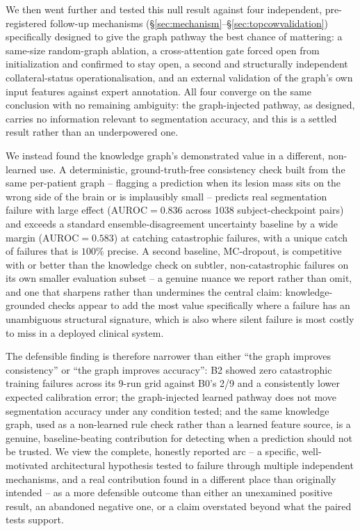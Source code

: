 \documentclass[conference]{IEEEtran}
\begin{document}
We then went further and tested this null result against four independent, pre-registered follow-up mechanisms (\S\ref{sec:mechanism}--\S\ref{sec:topcowvalidation}) specifically designed to give the graph pathway the best chance of mattering: a same-size random-graph ablation, a cross-attention gate forced open from initialization and confirmed to stay open, a second and structurally independent collateral-status operationalisation, and an external validation of the graph's own input features against expert annotation. All four converge on the same conclusion with no remaining ambiguity: the graph-injected pathway, as designed, carries no information relevant to segmentation accuracy, and this is a settled result rather than an underpowered one.

We instead found the knowledge graph's demonstrated value in a different, non-learned use. A deterministic, ground-truth-free consistency check built from the same per-patient graph -- flagging a prediction when its lesion mass sits on the wrong side of the brain or is implausibly small -- predicts real segmentation failure with large effect ($\mathrm{AUROC}=0.836$ across 1038 subject-checkpoint pairs) and exceeds a standard ensemble-disagreement uncertainty baseline by a wide margin ($\mathrm{AUROC}=0.583$) at catching catastrophic failures, with a unique catch of failures that is $100\%$ precise. A second baseline, MC-dropout, is competitive with or better than the knowledge check on subtler, non-catastrophic failures on its own smaller evaluation subset -- a genuine nuance we report rather than omit, and one that sharpens rather than undermines the central claim: knowledge-grounded checks appear to add the most value specifically where a failure has an unambiguous structural signature, which is also where silent failure is most costly to miss in a deployed clinical system.

The defensible finding is therefore narrower than either ``the graph improves consistency'' or ``the graph improves accuracy'': B2 showed zero catastrophic training failures across its 9-run grid against B0's 2/9 and a consistently lower expected calibration error; the graph-injected learned pathway does not move segmentation accuracy under any condition tested; and the same knowledge graph, used as a non-learned rule check rather than a learned feature source, is a genuine, baseline-beating contribution for detecting when a prediction should not be trusted. We view the complete, honestly reported arc -- a specific, well-motivated architectural hypothesis tested to failure through multiple independent mechanisms, and a real contribution found in a different place than originally intended -- as a more defensible outcome than either an unexamined positive result, an abandoned negative one, or a claim overstated beyond what the paired tests support.
\end{document}

